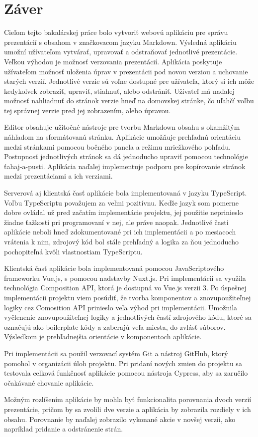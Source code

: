 \chapter{Záver}
\label{kapitola7}
Cieľom tejto bakalárskej práce bolo vytvoriť webovú aplikáciu pre správu prezentácií s obsahom v značkovacom jazyku Markdown. Výsledná aplikáciu umožní užívateľom vytvárať, upravovať a odstraňovať jednotlivé prezentácie. Veľkou výhodou je možnosť verzovania prezentácií. Aplikácia poskytuje užívateľom možnosť uloženia úprav v prezentácii pod novou verziou a uchovanie starých verzií. Jednotlivé verzie sú voľne dostupné pre užívateľa, ktorý si ich môže kedykoľvek zobraziť, upraviť, stiahnuť, alebo odstrániť. Užívateľ má naďalej možnosť nahliadnuť do stránok verzie hneď na domovskej stránke, čo uľahčí voľbu tej správnej verzie pred jej zobrazením, alebo úpravou. 

Editor obsahuje užitočné nástroje pre tvorbu Markdown obsahu s okamžitým náhľadom na sformátovanú stránku. Aplikácie umožňuje prehľadnú orientáciu medzi stránkami pomocou bočného panela a režimu mriežkového pohľadu. Postupnosť jednotlivých stránok sa dá jednoducho upraviť pomocou technológie ťahaj-a-pusti. Aplikácia naďalej implementuje podporu pre kopírovanie stránok medzi prezentáciami a ich verziami.

Serverová aj klientská časť aplikácie bola implementovaná v jazyku TypeScript. Voľbu TypeScriptu považujem za veľmi pozitívnu. Keďže jazyk som pomerne dobre ovládal už pred začatím implementácie projektu, jej použitie neprinieslo žiadne ťažkosti pri programovaní v nej, ale práve naopak. Jednotlivé časti aplikácie neboli hneď zdokumentované pri ich implementácii a po mesiacoch vrátenia k nim, zdrojový kód bol stále prehľadný a logika za ňou jednoducho pochopiteľná kvôli vlastnostiam TypeScriptu. 

Klientská časť aplikácie bola implementovaná pomocou JavaScriptového frameworku Vue.js, s pomocou nadstavby Nuxt.js. Pri implementácii sa využila technológia Composition API, ktorá je dostupná vo Vue.js verzii 3. Po úspešnej implementácii projektu viem posúdiť, že tvorba komponentov a znovupoužiteľnej logiky cez Comosition API prinieslo veľa výhod pri implementácii. Umožnila vyčlenenie znovupoužiteľnej logiky a jednotlivých častí zdrojového kódu, ktoré sa označujú ako boilerplate kódy a zaberajú veľa miesta, do zvlásť súborov. Výsledkom je prehľadnejšia orientácie v komponentoch aplikácie. 

Pri implementácii sa použil verzovací systém Git a nástroj GitHub, ktorý pomohol v organizácii úloh projektu. Pri pridaní nových zmien do projektu sa testovala celková funkčnosť aplikácie pomocou nástroja Cypress, aby sa zaručilo očakávané chovanie aplikácie.

Možným rozlíšením aplikácie by mohla byť funkcionalita porovnania dvoch verzií prezentácie, pričom by sa zvolili dve verzie a aplikácia by zobrazila rozdiely v ich obsahu. Porovnanie by naďalej zobrazilo vykonané akcie v novšej verzii, ako napríklad pridanie a odstránenie strán.